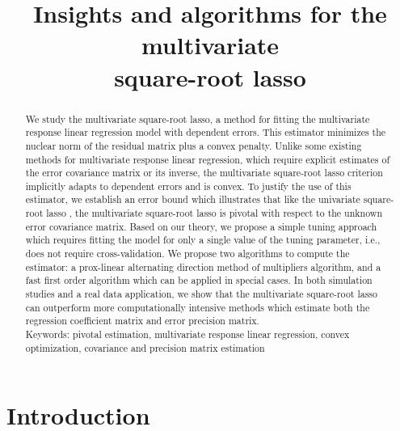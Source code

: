 \documentclass[12pt]{article}
\begin{document}
\title{Insights and algorithms for the multivariate\\ square-root lasso}

 \date{}
\maketitle
\begin{abstract}
{We study the multivariate square-root lasso, a method for fitting the multivariate response linear regression model with dependent errors. This estimator minimizes the nuclear norm of the residual matrix plus a convex penalty. Unlike some existing methods for multivariate response linear regression, which require explicit estimates of the error covariance matrix or its inverse, the multivariate square-root lasso criterion implicitly adapts to dependent errors and is convex. To justify the use of this estimator, we establish an error bound which illustrates that like the univariate square-root lasso \citep{belloni2011square}, the multivariate square-root lasso is pivotal with respect to the unknown error covariance matrix. Based on our theory, we propose a simple tuning approach which requires fitting the model for only a single value of the tuning parameter, i.e., does not require cross-validation. We propose two algorithms to compute the estimator: a prox-linear alternating direction method of multipliers algorithm, and a fast first order algorithm which can be applied in special cases. In both simulation studies and a real data application, we show that the multivariate square-root lasso can outperform more computationally intensive methods which estimate both the regression coefficient matrix and error precision matrix.\\

\noindent Keywords: pivotal estimation, multivariate response linear regression, convex optimization, covariance and precision matrix estimation}
\end{abstract}

\section{Introduction}
\end{document}
